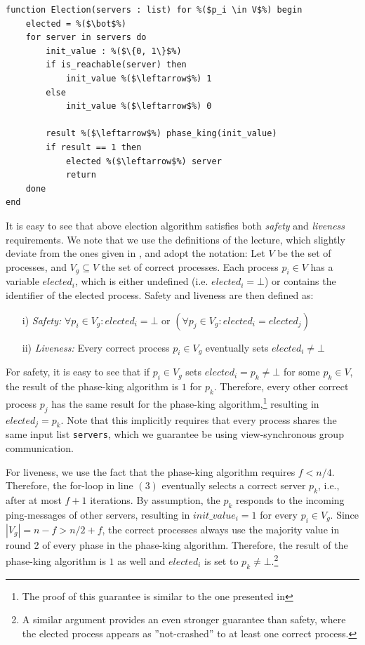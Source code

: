 \documentclass[runningheads]{llncs}
\begin{document}
\begin{lstlisting}
function Election(servers : list) for %($p_i \in V$%) begin 
    elected = %($\bot$%) 
    for server in servers do
        init_value : %($\{0, 1\}$%) 
        if is_reachable(server) then 
            init_value %($\leftarrow$%) 1 
        else 
            init_value %($\leftarrow$%) 0 

        result %($\leftarrow$%) phase_king(init_value)
        if result == 1 then 
            elected %($\leftarrow$%) server
            return
    done
end
\end{lstlisting}
It is easy to see that above election algorithm satisfies both \textit{safety} and \textit{liveness} requirements. We note that we use the definitions of the lecture, which slightly deviate from the ones given in \cite[p.~642]{ds_book}, and adopt the notation: Let $V$ be the set of processes, and $V_g \subseteq V$ the set of correct processes. Each process $p_i \in V$ has a variable $elected_i$, which is either undefined (i.e. $elected_i = \bot$) or contains the identifier of the elected process. Safety and liveness are then defined as:
\begin{enumerate}
    \item[i)] \textit{Safety:} $\forall p_i \in V_g: elected_i = \bot \text{ or } \left(\forall p_j \in V_g: elected_i = elected_j\right)$
    \item[ii)] \textit{Liveness:} Every correct process $p_i \in V_g$ eventually sets $elected_i \neq \bot$
\end{enumerate}
For safety, it is easy to see that if $p_i \in V_g$ sets $elected_i = p_k \neq \bot$ for some $p_k \in V$, the result of the phase-king algorithm is $1$ for $p_k$. Therefore, every other correct process $p_j$ has the same result for the phase-king algorithm,\footnote{The proof of this guarantee is similar to the one presented in } resulting in $elected_j = p_k$. Note that this implicitly requires that every process shares the same input list \texttt{servers}, which we guarantee be using view-synchronous group communication.

For liveness, we use the fact that the phase-king algorithm requires $f < n/4$. Therefore, the for-loop in line $(3)$ eventually selects a correct server $p_k$, i.e., after at most $f+1$ iterations. By assumption, the $p_k$ responds to the incoming ping-messages of other servers, resulting in $init\_value_i = 1$ for every $p_i \in V_g$. Since $|V_g| = n-f > n/2 + f$, the correct processes always use the majority value in round 2 of every phase in the phase-king algorithm. Therefore, the result of the phase-king algorithm is $1$ as well and $elected_i$ is set to $p_k \neq \bot$.\footnote{A similar argument provides an even stronger guarantee than safety, where the elected process appears as ''not-crashed'' to at least one correct process. }
\end{document}

